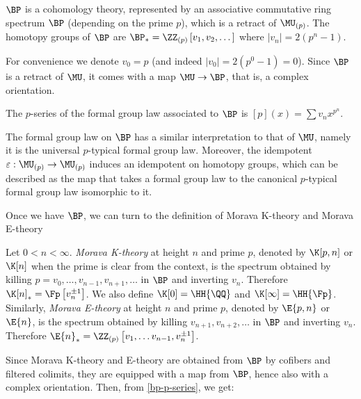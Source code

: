 \begin{theorem}
	$\BP$ is a cohomology theory, represented by an associative commutative ring spectrum $\BP$ (depending on the prime $p$), which is a retract of $\MU_{\left(p\right)}$.
	The homotopy groups of $\BP$ are $\BP_* = \ZZ_{\left(p\right)}\left[v_1, v_2, \dotsc\right]$ where $\left|v_n\right| = 2\left(p^n-1\right)$.
\end{theorem}

For convenience we denote $v_0 = p$ (and indeed $\left|v_0\right| = 2\left(p^0-1\right) = 0$).
Since $\BP$ is a retract of $\MU$, it comes with a map $\MU \to \BP$, that is, a complex orientation.

\begin{proposition}\label{bp-p-series}
	The $p$-series of the formal group law associated to $\BP$ is
	$\left[p\right]\left(x\right) = \sum v_n x^{p^n}$.
\end{proposition}

\begin{remark}
	The formal group law on $\BP$ has a similar interpretation to that of $\MU$, namely it is the universal $p$-typical formal group law.
	Moreover, the idempotent $\varepsilon: \MU_{\left(p\right)} \to \MU_{\left(p\right)}$ induces an idempotent on homotopy groups, which can be described as the map that takes a formal group law to the canonical $p$-typical formal group law isomorphic to it.
\end{remark}

Once we have $\BP$, we can turn to the definition of Morava K-theory and Morava E-theory

\begin{definition}
	Let $0 < n < \infty$.
	\emph{Morava K-theory} at height $n$ and prime $p$, denoted by $\K[p,n]$ or $\K[n]$ when the prime is clear from the context, is the spectrum obtained by killing $p=v_0, \dotsc, v_{n-1}, v_{n+1}, \dotsc$ in $\BP$ and inverting $v_n$.
	Therefore $\K[n]_* = \Fp\left[v_n^{\pm 1}\right]$.
	We also define $\K[0] = \HH{\QQ}$ and $\K[\infty] = \HH{\Fp}$.
	Similarly, \emph{Morava E-theory} at height $n$ and prime $p$, denoted by $\E{p,n}$ or $\E{n}$, is the spectrum obtained by killing $v_{n+1}, v_{n+2}, \dotsc$ in $\BP$ and inverting $v_n$.
	Therefore $\E{n}_* = \ZZ_{\left(p\right)}\left[v_1, \dotsc v_{n-1}, v_n^{\pm 1}\right]$.
\end{definition}

Since Morava K-theory and E-theory are obtained from $\BP$ by cofibers and filtered colimits, they are equipped with a map from $\BP$, hence also with a complex orientation.
Then, from \ref{bp-p-series}, we get:

